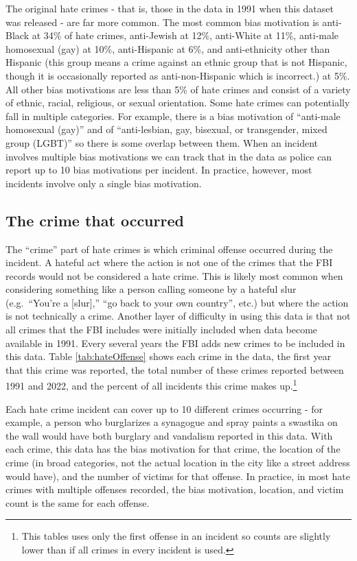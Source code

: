 \documentclass[
]{krantz}
\begin{document}
The original hate crimes - that is, those in the data in
1991 when this dataset was released - are far more common.
The most common bias motivation is anti-Black at 34\% of
hate crimes, anti-Jewish at 12\%, anti-White at 11\%,
anti-male homosexual (gay) at 10\%, anti-Hispanic at 6\%,
and anti-ethnicity other than Hispanic (this group means a
crime against an ethnic group that is not Hispanic, though
it is occasionally reported as anti-non-Hispanic which is
incorrect.) at 5\%. All other bias motivations are less than
5\% of hate crimes and consist of a variety of ethnic,
racial, religious, or sexual orientation. Some hate crimes
can potentially fall in multiple categories. For example,
there is a bias motivation of ``anti-male homosexual (gay)''
and of ``anti-lesbian, gay, bisexual, or transgender, mixed
group (LGBT)'' so there is some overlap between them. When
an incident involves multiple bias motivations we can track
that in the data as police can report up to 10 bias
motivations per incident. In practice, however, most
incidents involve only a single bias motivation.

\subsection{The crime that
occurred}\label{the-crime-that-occurred}

The ``crime'' part of hate crimes is which criminal offense
occurred during the incident. A hateful act where the action
is not one of the crimes that the FBI records would not be
considered a hate crime. This is likely most common when
considering something like a person calling someone by a
hateful slur (e.g.~``You're a {[}slur{]},'' ``go back to
your own country'', etc.) but where the action is not
technically a crime. Another layer of difficulty in using
this data is that not all crimes that the FBI includes were
initially included when data become available in 1991. Every
several years the FBI adds new crimes to be included in this
data. Table \ref{tab:hateOffense} shows each crime in the
data, the first year that this crime was reported, the total
number of these crimes reported between 1991 and 2022, and
the percent of all incidents this crime makes up.\footnote{This
  tables uses only the first offense in an incident so
  counts are slightly lower than if all crimes in every
  incident is used.}

Each hate crime incident can cover up to 10 different crimes
occurring - for example, a person who burglarizes a
synagogue and spray paints a swastika on the wall would have
both burglary and vandalism reported in this data. With each
crime, this data has the bias motivation for that crime, the
location of the crime (in broad categories, not the actual
location in the city like a street address would have), and
the number of victims for that offense. In practice, in most
hate crimes with multiple offenses recorded, the bias
motivation, location, and victim count is the same for each
offense.
\end{document}
